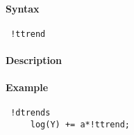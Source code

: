 


	\paragraph{Syntax}
 
 \begin{verbatim}
 !ttrend
 \end{verbatim}
 
 \paragraph{Description}
 
 \paragraph{Example}
 
 \begin{verbatim}
 !dtrends
     log(Y) += a*!ttrend;
 \end{verbatim}


